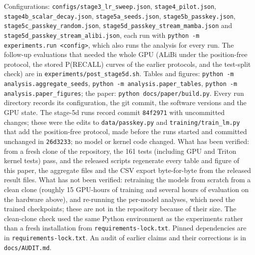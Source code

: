 \documentclass[11pt]{article}
\begin{document}
Configurations: \texttt{configs/stage3\_lr\_sweep.json}, \texttt{stage4\_pilot.json}, \texttt{stage4b\_scalar\_decay.json}, \texttt{stage5a\_seeds.json}, \texttt{stage5b\_passkey.json}, \texttt{stage5c\_passkey\_random.json}, \texttt{stage5d\_passkey\_stream\_mamba.json} and \texttt{stage5d\_passkey\_stream\_alibi.json}, each run with \texttt{python -m experiments.run <config>}, which also runs the analysis for every run. The follow-up evaluations that needed the whole GPU (ALiBi under the position-free protocol, the stored P(RECALL) curves of the earlier protocols, and the test-split check) are in \texttt{experiments/post\_stage5d.sh}. Tables and figures: \texttt{python -m analysis.aggregate\_seeds}, \texttt{python -m analysis.paper\_tables}, \texttt{python -m analysis.paper\_figures}; the paper: \texttt{python docs/paper/build.py}. Every run directory records its configuration, the git commit, the software versions and the GPU state. The stage-5d runs record commit \texttt{84f2971} with uncommitted changes; these were the edits to \texttt{data/passkey.py} and \texttt{training/train\_lm.py} that add the position-free protocol, made before the runs started and committed unchanged in \texttt{26d3233}; no model or kernel code changed. What has been verified: from a fresh clone of the repository, the 161 tests (including GPU and Triton kernel tests) pass, and the released scripts regenerate every table and figure of this paper, the aggregate files and the CSV export byte-for-byte from the released result files. What has not been verified: retraining the models from scratch from a clean clone (roughly 15 GPU-hours of training and several hours of evaluation on the hardware above), and re-running the per-model analyses, which need the trained checkpoints; these are not in the repository because of their size. The clean-clone check used the same Python environment as the experiments rather than a fresh installation from \texttt{requirements-lock.txt}. Pinned dependencies are in \texttt{requirements-lock.txt}. An audit of earlier claims and their corrections is in \texttt{docs/AUDIT.md}.
\end{document}
